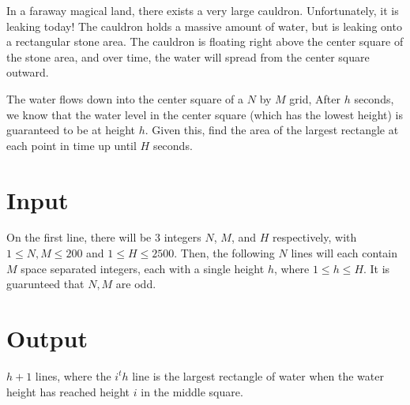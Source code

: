 
In a faraway magical land, there exists a very large cauldron. Unfortunately, it is leaking today! The cauldron holds a massive amount of water, but is leaking onto a rectangular stone area. The cauldron is floating right above the center square of the stone area, and over time, the water will spread from the center square outward.

The water flows down into the center square of a $N$ by $M$ grid, After $h$ seconds, we know that the water level in the center square (which has the lowest height) is guaranteed to be at height $h$. Given this, find the area of the largest rectangle at each point in time up until $H$ seconds.

\section*{Input}
On the first line, there will be 3 integers $N$, $M$, and $H$ respectively, with $1 \le N, M \le 200$ and $1 \le H \le 2500$. Then, the following $N$ lines will each contain $M$ space separated integers, each with a single height $h$, where $1 \le h \le H$. It is guarunteed that $N, M$ are odd.

\section*{Output}
$h + 1$ lines, where the $i^th$ line is the largest rectangle of water when the water height has reached height $i$ in the middle square. 
